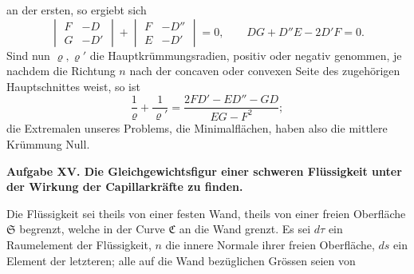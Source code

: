 \documentclass[11pt,a4paper,leqno]{article}
\begin{document}
an der ersten, so ergiebt sich
\[
\begin{vmatrix}F&-D\\G&-D'\end{vmatrix}
+\begin{vmatrix}F&-D''\\E&-D'\end{vmatrix}=0,
\qquad DG+D''E-2D'F=0.
\]
Sind nun $\varrho,\varrho'$ die Hauptkrümmungsradien, positiv oder negativ
genommen, je nachdem die Richtung $n$ nach der concaven oder
convexen Seite des zugehörigen Hauptschnittes weist, so ist
\begin{equation}\tag{12}
\frac{1}{\varrho}+\frac{1}{\varrho'}
=\frac{2FD'-ED''-GD}{EG-F^2};
\end{equation}
die Extremalen unseres Problems, die Minimalflächen, haben also
die mittlere Krümmung Null.

\begin{center}
\textbf{Aufgabe XV. Die Gleichgewichtsfigur einer schweren
Flüssigkeit unter der Wirkung der Capillarkräfte zu finden.}
\end{center}

Die Flüssigkeit sei theils von einer festen Wand, theils von
einer freien Oberfläche $\mathfrak{S}$ begrenzt, welche in der Curve $\mathfrak{C}$ an
die Wand grenzt. Es sei $d\tau$ ein Raumelement der Flüssigkeit,
$n$ die innere Normale ihrer freien Oberfläche, $ds$ ein Element
der letzteren; alle auf die Wand bezüglichen Grössen seien von
\end{document}
